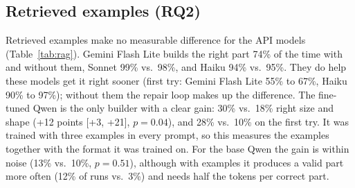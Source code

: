 \subsection{Retrieved examples (RQ2)}
\label{sec:res-rag}
Retrieved examples make no measurable difference for the API models (Table~\ref{tab:rag}).
Gemini Flash Lite builds the right part 74\% of the time with and without them, Sonnet 99\% vs.\ 98\%, and Haiku 94\% vs.\ 95\%.
They do help these models get it right sooner (first try: Gemini Flash Lite 55\% to 67\%, Haiku 90\% to 97\%); without them the repair loop makes up the difference.
The fine-tuned Qwen is the only builder with a clear gain: 30\% vs.\ 18\% right size and shape (+12 points [+3, +21], $p = 0.04$), and 28\% vs.\ 10\% on the first try.
It was trained with three examples in every prompt, so this measures the examples together with the format it was trained on.
For the base Qwen the gain is within noise (13\% vs.\ 10\%, $p = 0.51$), although with examples it produces a valid part more often (12\% of runs vs.\ 3\%) and needs half the tokens per correct part.

